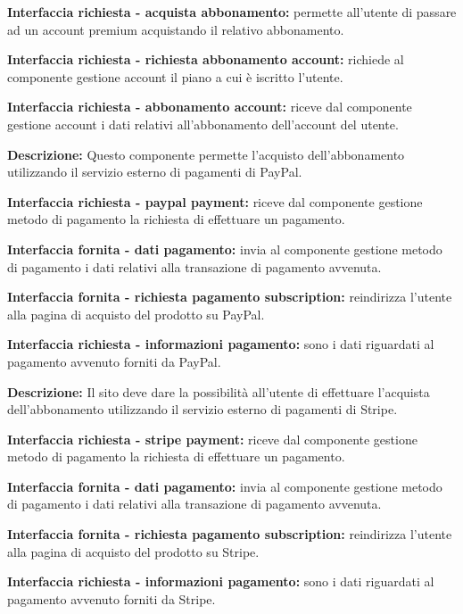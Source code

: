 \begin{listaPersonale}[DCI]{}
    \textbf{Interfaccia richiesta - acquista abbonamento:} permette all'utente di passare ad un account premium acquistando il relativo abbonamento.

    \textbf{Interfaccia richiesta - richiesta abbonamento account:} richiede al componente gestione account il piano a cui è iscritto l'utente.

    \textbf{Interfaccia richiesta - abbonamento account:} riceve dal componente gestione account i dati relativi all'abbonamento dell'account del utente.



    \textbf{Descrizione:} Questo componente permette l'acquisto dell'abbonamento utilizzando il servizio esterno di pagamenti di PayPal.

    \textbf{Interfaccia richiesta - paypal payment:} riceve dal componente gestione metodo di pagamento la richiesta di effettuare un pagamento.

    \textbf{Interfaccia fornita - dati pagamento:} invia al componente gestione metodo di pagamento i dati relativi alla transazione di pagamento avvenuta.

    \textbf{Interfaccia fornita - richiesta pagamento subscription:} reindirizza l'utente alla pagina di acquisto del prodotto su PayPal.

    \textbf{Interfaccia richiesta - informazioni pagamento:} sono i dati riguardati al pagamento avvenuto forniti da PayPal.



    \textbf{Descrizione:} Il sito deve dare la possibilità all'utente di effettuare l'acquista dell'abbonamento utilizzando il servizio esterno di pagamenti di Stripe.

    \textbf{Interfaccia richiesta - stripe payment:} riceve dal componente gestione metodo di pagamento la richiesta di effettuare un pagamento.

    \textbf{Interfaccia fornita - dati pagamento:} invia al componente gestione metodo di pagamento i dati relativi alla transazione di pagamento avvenuta.

    \textbf{Interfaccia fornita - richiesta pagamento subscription:} reindirizza l'utente alla pagina di acquisto del prodotto su Stripe.

    \textbf{Interfaccia richiesta - informazioni pagamento:} sono i dati riguardati al pagamento avvenuto forniti da Stripe.



\end{listaPersonale}
